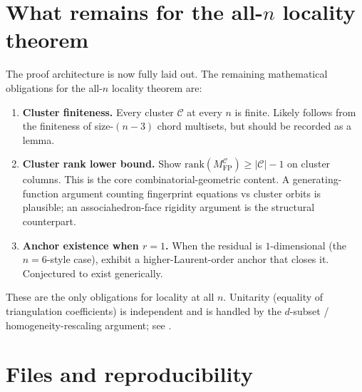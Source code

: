 \documentclass[11pt]{article}
\theoremstyle{definition}
\begin{document}
\section{What remains for the all-$n$ locality theorem}\label{sec:remaining}

The proof architecture is now fully laid out. The remaining
mathematical obligations for the all-$n$ locality theorem are:

\begin{enumerate}[leftmargin=*,topsep=2pt,itemsep=2pt]
\item \textbf{Cluster finiteness.} Every cluster $\mathcal C$ at
every $n$ is finite. Likely follows from the finiteness of
size-$(n-3)$ chord multisets, but should be recorded as a lemma.

\item \textbf{Cluster rank lower bound.} Show
$\mathrm{rank}(M_{\mathrm{FP}}^{\mathcal C})\ge|\mathcal C|-1$
on cluster columns. This is the core combinatorial-geometric
content. A generating-function argument counting fingerprint
equations vs cluster orbits is plausible; an associahedron-face
rigidity argument is the structural counterpart.

\item \textbf{Anchor existence when $r=1$.} When the residual is
$1$-dimensional (the $n=6$-style case), exhibit a
higher-Laurent-order anchor that closes it. Conjectured to exist
generically.
\end{enumerate}

These are the only obligations for locality at all $n$. Unitarity
(equality of triangulation coefficients) is independent and is
handled by the $d$-subset / homogeneity-rescaling argument; see
\cite{notes18,subsetvan,notes11}.

\section*{Files and reproducibility}
\end{document}

